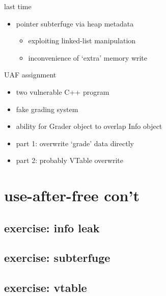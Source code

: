 \date{}
\title{}
\usepackage[outputdir=latex.out]{minted}

\begin{frame}
    \titlepage
\end{frame}



\begin{frame}{last time}
    \begin{itemize}
    \item pointer subterfuge via heap metadata
        \begin{itemize}
        \item exploiting linked-list manipulation
        \item inconvenience of `extra' memory write
        \end{itemize}
    \end{itemize}
\end{frame}

\begin{frame}{UAF assignment}
    \begin{itemize}
    \item two vulnerable C++ program
    \item fake grading system
    \item ability for Grader object to overlap Info object
    \item part 1: overwrite `grade' data directly
    \item part 2: probably VTable overwrite
    \end{itemize}
\end{frame}

\section{use-after-free con't}
\subsection{exercise: info leak}


\subsection{exercise: subterfuge}


\subsection{exercise: vtable}


